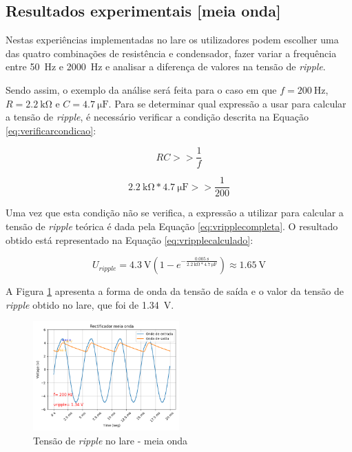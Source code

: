 \subsection{Resultados experimentais [meia onda]}
\label{sec:resultados_RectificadoresMeiaOnda}
Nestas experiências implementadas no \acrshort{lare} os utilizadores podem escolher uma das quatro combinações de resistência e condensador, fazer variar a frequência entre \SI{50}{\hertz} e \SI{2000}{\hertz} e analisar a diferença de valores na tensão de \textit{ripple}.

Sendo assim, o exemplo da análise será feita para o caso em que $f=\SI{200}{\hertz}$, $R=\SI{2.2}{\kilo\ohm}$ e $C=\SI{4.7}{\micro\farad}$. Para se determinar qual expressão a usar para calcular a tensão de \textit{ripple}, é necessário verificar a condição descrita na Equação \ref{eq:verificarcondicao}:

\begin{equation} \label{eq:verificarcondicao}
	RC >> \dfrac{1}{f}
\end{equation}

\begin{equation}
	\SI{2.2}{\kilo\ohm} * \SI{4.7}{\micro\farad} >> \dfrac{1}{200}
\end{equation}

Uma vez que esta condição não se verifica, a expressão a utilizar para calcular a tensão de \textit{ripple} teórica é dada pela Equação \ref{eq:vripplecompleta}. O resultado obtido está representado na Equação \ref{eq:vripplecalculado}:

\begin{equation} \label{eq:vripplecalculado}
	U_{ripple} = \SI{4.3}{\volt}(1-e^{-\frac{\SI{0.005}{\second}}{\SI{2.2}{\kilo\ohm}*\SI{4.7}{\micro\farad}}}) \approx \SI{1.65}{\volt}
\end{equation}

A Figura \ref{fig:ripplelaremeiaonda} apresenta a forma de onda da tensão de saída e o valor da tensão de \textit{ripple} obtido no \acrshort{lare}, que foi de \SI{1.34}{\volt}.

\begin{figure}[hbtp]
	\centering
	\includegraphics[width=0.5\textwidth]{figures/resultados_LaRE_meia_onda.png}
	\caption{Tensão de \textit{ripple} no \acrshort{lare} - meia onda}
	\label{fig:ripplelaremeiaonda}
\end{figure}

